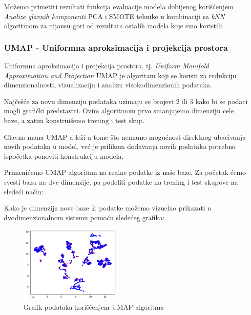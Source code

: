 \documentclass[12pt]{article}
\theoremstyle{definition}
\theoremstyle{remark}
\begin{document}
Možemo primetiti rezultati funkcija evaluacije modela dobijenog korišćenjem \emph{Analize glavnih komponenti} PCA i SMOTE tehnike u kombinaciji sa \emph{kNN} algoritmom za nijansu gori od rezultata ostalih modela koje smo koristili.

\subsubsection{UMAP - Uniformna aproksimacija i projekcija prostora}

Uniformna aproksimacija i projekcija prostora, tj. \emph{Uniform Manifold Approximation and Projection} UMAP je algoritam koji se koristi za redukciju dimenzionalnosti, vizualizaciju i analizu visokodimenzionih podataka. 

Najčešće za novu dimenziju podataka uzimaju se brojevi $2$ ili $3$ kako bi se podaci mogli grafički predstaviti. Ovim algoritmom prvo smanjujemo dimenziju cele baze, a zatim konstruišemo trening i test skup. 

Glavna mana UMAP-a leži u tome što nemamo mogućnost direktnog ubacivanja novih podataka u model, već je prilikom dodavanja novih podataka potrebno ispočetka ponoviti konstrukciju modela.


Primenićemo UMAP algoritam na realne podatke iz naše baze. Za početak ćemo svesti bazu na dve dimenzije, pa podeliti podatke na trening i test skupove na sledeći način:

\hfill


\hfill

Kako je dimenzija nove baze $2$, podatke možemo vizuelno prikazati u dvodimenzionalnom sistemu pomoću sledećeg grafika:


\begin{figure}[htp]
    \centering
    \includegraphics[width=0.45\textwidth]{output_43_0.png}
    \caption{Grafik podataka korišćenjem UMAP algoritma}
    \label{fig:galaxy}
\end{figure}
\end{document}
